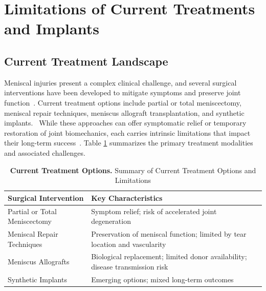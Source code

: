 \section{Limitations of Current Treatments and Implants}

\subsection{Current Treatment Landscape}

Meniscal injuries present a complex clinical challenge, and several surgical interventions have been developed to mitigate symptoms and preserve joint function~\cite{kwon2019surgicaltissue, li2024totalmeniscus, merriam2015successfultotal, sun2017overviewscaffold}.
Current treatment options include partial or total meniscectomy, meniscal repair techniques, meniscus allograft transplantation, and synthetic implants.~\cite{beeler2020meniscussizing}
While these approaches can offer symptomatic relief or temporary restoration of joint biomechanics, each carries intrinsic limitations that impact their long-term success~\cite{ghodbane2019partialmeniscus, sun2017overviewscaffold}.
Table \ref{tab:treatment_summary} summarizes the primary treatment modalities and associated challenges.

\begin{table}[H]
    \centering
    \renewcommand{\arraystretch}{1.2}
    \setlength{\tabcolsep}{8pt}
    \begin{tabular}{|l|p{8cm}|}
        \hline
        \rowcolor{blue!20}
        \textbf{Surgical Intervention} & \textbf{Key Characteristics} \\ \hline
        Partial or Total Meniscectomy & Symptom relief; risk of accelerated joint degeneration \\ \hline
        Meniscal Repair Techniques & Preservation of meniscal function; limited by tear location and vascularity \\ \hline
        Meniscus Allografts & Biological replacement; limited donor availability; disease transmission risk \\ \hline
        Synthetic Implants & Emerging options; mixed long-term outcomes \\ \hline
    \end{tabular}
    \caption{\textbf{Current Treatment Options.} Summary of Current Treatment Options and Limitations}
    \label{tab:treatment_summary}
\end{table}

